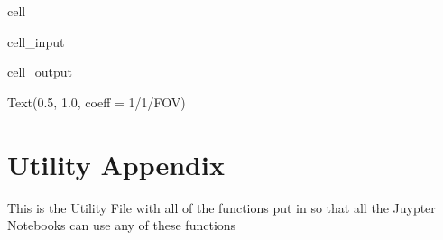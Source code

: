 \documentclass[letterpaper,10pt,english]{jupyterBook}
\begin{document}
\begin{sphinxuseclass}{cell}\begin{sphinxVerbatimInput}

\begin{sphinxuseclass}{cell_input}
\begin{sphinxVerbatim}[commandchars=\\\{\}]
\end{sphinxVerbatim}

\end{sphinxuseclass}\end{sphinxVerbatimInput}
\begin{sphinxVerbatimOutput}

\begin{sphinxuseclass}{cell_output}
\begin{sphinxVerbatim}[commandchars=\\\{\}]
Text(0.5, 1.0, \PYGZsq{}coeff = 1/1/FOV\PYGZsq{})
\end{sphinxVerbatim}

\noindent{}

\end{sphinxuseclass}\end{sphinxVerbatimOutput}

\end{sphinxuseclass}
\sphinxstepscope


\chapter{Utility Appendix}
\label{\detokenize{utility:utility-appendix}}\label{\detokenize{utility::doc}}
\sphinxAtStartPar
This is the Utility File with all of the functions put in so that all the Juypter Notebooks can use any of these functions
\end{document}
